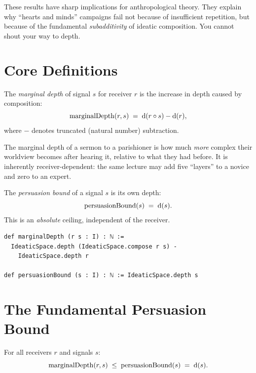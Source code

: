 These results have sharp implications for anthropological theory.  They
explain why ``hearts and minds'' campaigns fail not because of insufficient
repetition, but because of the fundamental \emph{subadditivity} of ideatic
composition.  You cannot shout your way to depth.


\section{Core Definitions}
\label{sec:pers-defs}

\begin{definition}
\label{def:marginal-depth}
The \emph{marginal depth} of signal $s$ for receiver $r$ is the increase
in depth caused by composition:
\[
  \mathrm{marginalDepth}(r,s) \;=\; \operatorname{d}(r\circ s) - \operatorname{d}(r),
\]
where $-$ denotes truncated (natural number) subtraction.
\end{definition}

The marginal depth of a sermon to a parishioner is how much \emph{more}
complex their worldview becomes after hearing it, relative to what they
had before.  It is inherently receiver-dependent: the same lecture may add
five ``layers'' to a novice and zero to an expert.

\begin{definition}
\label{def:persuasion-bound}
The \emph{persuasion bound} of a signal $s$ is its own depth:
\[
  \mathrm{persuasionBound}(s) \;=\; \operatorname{d}(s).
\]
This is an \emph{absolute} ceiling, independent of the receiver.
\end{definition}

\begin{lstlisting}[caption={Marginal depth and persuasion bound in Lean~4.}]
def marginalDepth (r s : I) : ℕ :=
  IdeaticSpace.depth (IdeaticSpace.compose r s) -
    IdeaticSpace.depth r

def persuasionBound (s : I) : ℕ := IdeaticSpace.depth s
\end{lstlisting}


\section{The Fundamental Persuasion Bound}
\label{sec:pers-fundamental}

\begin{theorem}
\label{thm:marginal-depth-bound}
For all receivers $r$ and signals $s$:
\[
  \mathrm{marginalDepth}(r,s) \;\le\; \mathrm{persuasionBound}(s)
  \;=\; \operatorname{d}(s).
\]
\end{theorem}

